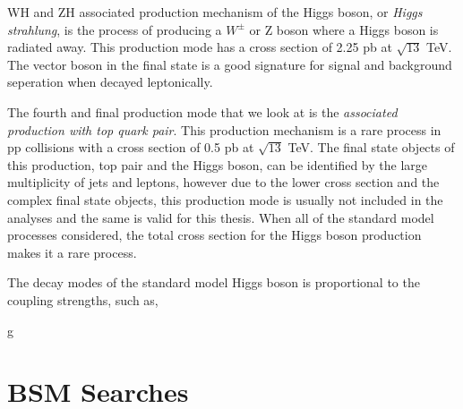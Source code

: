 WH and ZH associated production mechanism of the Higgs boson, or \emph{Higgs strahlung}, is the process of producing a $W^\pm$ or Z boson where a Higgs boson is radiated away. This production mode has a cross section of 2.25 pb at $\sqrt{13}$ TeV. The vector boson in the final state is a good signature for signal and background seperation when decayed leptonically.

The fourth and final production mode that we look at is the \emph{associated production with top quark pair}. This production mechanism is a rare process in pp collisions with a cross section of 0.5 pb at $\sqrt{13}$ TeV. The final state objects of this production, top pair and the Higgs boson, can be identified by the large multiplicity of jets and leptons, however due to the lower cross section and the complex final state objects, this production mode is usually not included in the analyses and the same is valid for this thesis. When all of the standard model processes considered, the total cross section for the Higgs boson production makes it a rare process.

The decay modes of the standard model Higgs boson is proportional to the coupling strengths, such as,

\be
g
\ee



\section{BSM Searches}


